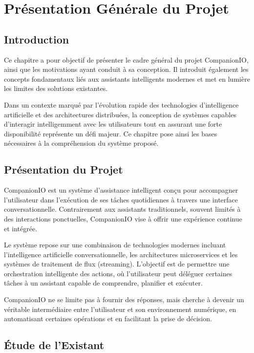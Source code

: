\chapter{Présentation Générale du Projet}

\section{Introduction}

Ce chapitre a pour objectif de présenter le cadre général du projet CompanionIO, ainsi que les motivations ayant conduit à sa conception. Il introduit également les concepts fondamentaux liés aux assistants intelligents modernes et met en lumière les limites des solutions existantes.

Dans un contexte marqué par l’évolution rapide des technologies d’intelligence artificielle et des architectures distribuées, la conception de systèmes capables d’interagir intelligemment avec les utilisateurs tout en assurant une forte disponibilité représente un défi majeur. Ce chapitre pose ainsi les bases nécessaires à la compréhension du système proposé.

\section{Présentation du Projet}

CompanionIO est un système d’assistance intelligent conçu pour accompagner l’utilisateur dans l’exécution de ses tâches quotidiennes à travers une interface conversationnelle. Contrairement aux assistants traditionnels, souvent limités à des interactions ponctuelles, CompanionIO vise à offrir une expérience continue et intégrée.

Le système repose sur une combinaison de technologies modernes incluant l’intelligence artificielle conversationnelle, les architectures microservices et les systèmes de traitement de flux (streaming). L’objectif est de permettre une orchestration intelligente des actions, où l’utilisateur peut déléguer certaines tâches à un assistant capable de comprendre, planifier et exécuter.

CompanionIO ne se limite pas à fournir des réponses, mais cherche à devenir un véritable intermédiaire entre l’utilisateur et son environnement numérique, en automatisant certaines opérations et en facilitant la prise de décision.

\section{Étude de l’Existant}


